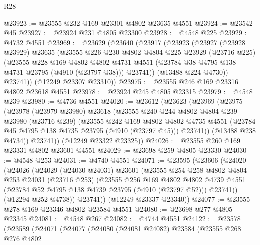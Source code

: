 \begin{lexlean}{R28}
\begin{coremodule}
@23923 := @23555 @232 @169 @23301 @4802 @23635 @4551
@23924 := @23542 @45
@23927 := @23924 @231 @4805 @23300
@23928 := @4548 @225
@23929 := @4732 @4551
@23969 := @23629
    (@23640
      (@23917
        (@23923
          (@23927
            (@23928 @23929)
            @23635
            (@23555
              @226
              @230
              @4802
              @4804
              @225
              @23929
              (@23716 @225)
              (@23555
                @228
                @169
                @4802
                @4802
                @4731
                @4551
                (@23784 @38 @4795 @138 @4731 @23795 (@4910 (@23797 @38)))
                @23741))
            (@13488 @224 @4730))
          @23741))
      (@12249 @23307 @23310))
@23975 := @23555 @246 @169 @23316 @4802 @23618 @4551
@23978 := @23924 @245 @4805 @23315
@23979 := @4548 @239
@23980 := @4736 @4551
@24020 := @23612
    (@23623
      (@23969
        (@23975
          (@23978
            (@23979 @23980)
            @23618
            (@23555
              @240
              @244
              @4802
              @4804
              @239
              @23980
              (@23716 @239)
              (@23555
                @242
                @169
                @4802
                @4802
                @4735
                @4551
                (@23784 @45 @4795 @138 @4735 @23795 (@4910 (@23797 @45)))
                @23741))
            (@13488 @238 @4734))
          @23741))
      (@12249 @23322 @23325))
@24026 := @23555 @260 @169 @23331 @4802 @23601 @4551
@24029 := @23698 @259 @4805 @23330
@24030 := @4548 @253
@24031 := @4740 @4551
@24071 := @23595
    (@23606
      (@24020
        (@24026
          (@24029
            (@24030 @24031)
            @23601
            (@23555
              @254
              @258
              @4802
              @4804
              @253
              @24031
              (@23716 @253)
              (@23555
                @256
                @169
                @4802
                @4802
                @4739
                @4551
                (@23784 @52 @4795 @138 @4739 @23795 (@4910 (@23797 @52)))
                @23741))
            (@12294 @252 @4738))
          @23741))
      (@12249 @23337 @23340))
@24077 := @23555 @278 @169 @23346 @4802 @23584 @4551
@24080 := @23698 @277 @4805 @23345
@24081 := @4548 @267
@24082 := @4744 @4551
@24122 := @23578
    (@23589
      (@24071
        (@24077
          (@24080
            (@24081 @24082)
            @23584
            (@23555
              @268
              @276
              @4802

\end{coremodule}
\end{lexlean}

